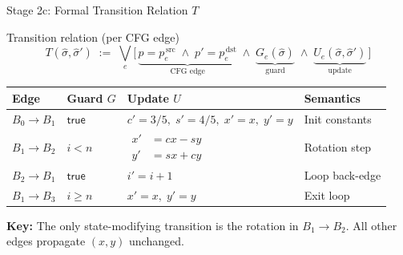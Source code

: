 \documentclass[aspectratio=169]{beamer}
\begin{document}
\begin{frame}{Stage 2c: Formal Transition Relation $T$}
\begin{block}{Transition relation (per CFG edge)}
\vspace{-0.3em}
\[
  T(\hat\sigma, \hat\sigma') \;:=\; \bigvee_{e} \bigl[\,
    \underbrace{p = p_e^{\,\mathrm{src}} \;\wedge\; p' = p_e^{\,\mathrm{dst}}}_{\text{CFG edge}} \;\wedge\;
    \underbrace{G_{e}(\hat\sigma)}_{\text{guard}} \;\wedge\;
    \underbrace{U_{e}(\hat\sigma, \hat\sigma')}_{\text{update}}
  \,\bigr]
\]
\end{block}

\vspace{0.2em}
\footnotesize
\renewcommand{\arraystretch}{1.4}
\begin{tabular}{@{}llll@{}}
\toprule
\textbf{Edge} & \textbf{Guard $G$} & \textbf{Update $U$} & \textbf{Semantics} \\
\midrule
$B_0 \to B_1$ & $\mathsf{true}$ &
  $c' = 3/5,\; s' = 4/5,\; x' = x,\; y' = y$ & Init constants \\
$B_1 \to B_2$ & $i < n$ &
  $\begin{aligned}x' &= cx - sy\\ y' &= sx + cy\end{aligned}$ & Rotation step \\
$B_2 \to B_1$ & $\mathsf{true}$ &
  $i' = i + 1$ & Loop back-edge \\
$B_1 \to B_3$ & $i \ge n$ &
  $x' = x,\; y' = y$ & Exit loop \\
\bottomrule
\end{tabular}

\vspace{0.5em}
\normalsize
\textbf{Key:} The only state-modifying transition is the rotation in $B_1 \to B_2$.
All other edges propagate $(x,y)$ unchanged.
\end{frame}


\end{document}
